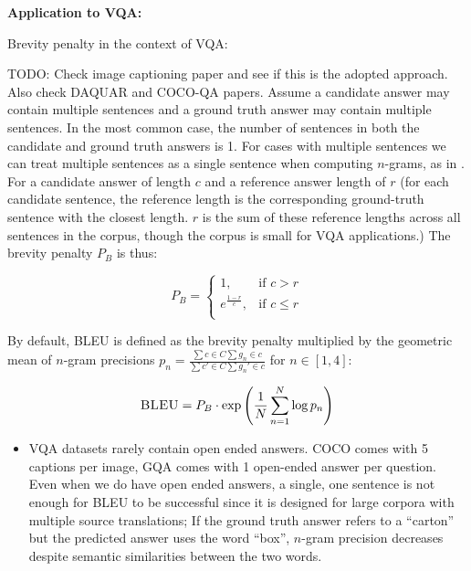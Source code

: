 \textbf{Application to VQA:}

Brevity penalty in the context of VQA:

{\color{red} TODO: Check image captioning paper and see if this is the adopted approach. Also check DAQUAR and COCO-QA papers.} Assume a candidate answer may contain multiple sentences and a ground truth answer may contain multiple sentences. In the most common case, the number of sentences in both the candidate and ground truth answers is 1. For cases with multiple sentences we can treat multiple sentences as a single sentence when computing \(n\)-grams, as in \cite{papineni2002bleu}. For a candidate answer of length \(c\) and a reference answer length of \(r\) (for each candidate sentence, the reference length is the corresponding ground-truth sentence with the closest length. \(r\) is the sum of these reference lengths across all sentences in the corpus, though the corpus is small for VQA applications.) The brevity penalty \(P_B\) is thus:

\begin{equation*}
    P_B = \begin{cases}
    1, &\text{if } c > r\\
    e^{\frac{1-r}{c}}, &\text{if } c \leq r\\
    \end{cases}
\end{equation*}


By default, BLEU is defined as the brevity penalty multiplied by the geometric mean of \(n\)-gram precisions \(p_n = \frac{\sum{c \in C} \sum g_n \in c }{\sum{c' \in C} \sum g_n' \in c}\) for \(n \in [1, 4]\):

\begin{equation*}
    \textsc{BLEU} = P_B \cdot \exp \left(\frac{1}{N} \sum_{n=1}^N \log p_n\right)
\end{equation*}

\begin{itemize}
    \item VQA datasets rarely contain open ended answers. COCO comes with 5 captions per image, GQA comes with 1 open-ended answer per question. Even when we do have open ended answers, a single, one sentence is not enough for BLEU to be successful since it is designed for large corpora with multiple source translations; If the ground truth answer refers to a ``carton'' but the predicted answer uses the word ``box'', \(n\)-gram precision decreases despite semantic similarities between the two words. 
\end{itemize}

